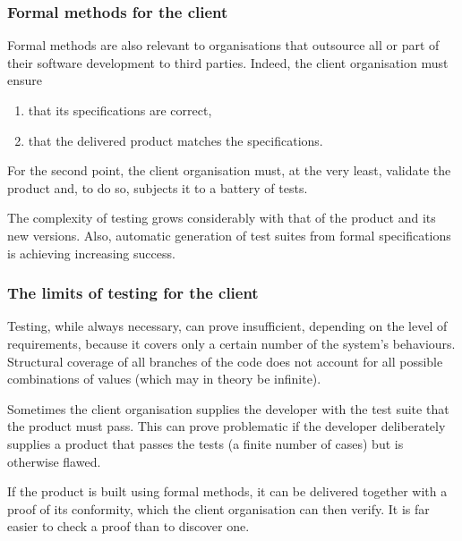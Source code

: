 \documentclass[compress,dvipdfmx]{beamer}
\begin{document}
%
\begin{frame}
  \frametitle{Formal methods for the client}

  Formal methods are also relevant to organisations that outsource all
  or part of their software development to third parties. Indeed, the
  client organisation must ensure
  \begin{enumerate}

    \item that its specifications are correct,

    \item that the delivered product matches the specifications.

  \end{enumerate}

  \medskip

  For the second point, the client organisation must, at the very
  least, validate the product and, to do so, subjects it to a battery
  of tests.

  \bigskip

  The complexity of testing grows considerably with that of the
  product and its new versions. Also, automatic generation of test
  suites from formal specifications is achieving increasing success.

\end{frame}

%
\begin{frame}
  \frametitle{The limits of testing for the client}

  Testing, while always necessary, can prove insufficient,
  depending on the level of requirements, because it covers only a
  certain number of the system's behaviours. Structural coverage of
  all branches of the code does not account for all possible
  combinations of values (which may in theory be infinite).

  \bigskip

  Sometimes the client organisation supplies the developer with the
  test suite that the product must pass. This can prove problematic if
  the developer deliberately supplies a product that passes the tests
  (a finite number of cases) but is otherwise flawed.

  \bigskip

  If the product is built using formal methods, it can be delivered
  together with a proof of its conformity, which the client
  organisation can then verify. It is far easier to check a proof than
  to discover one.

\end{frame}
\end{document}
